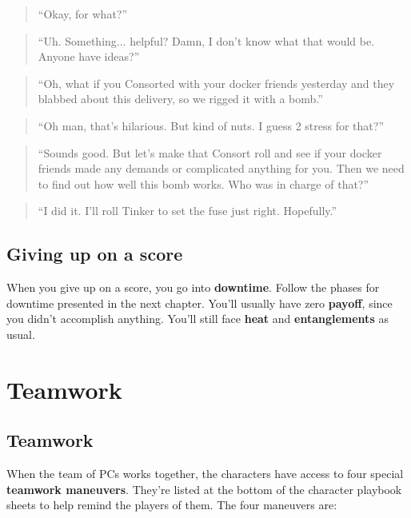\documentclass[11pt,fleqn,a5paper]{book}
\newcommand{\gameterm}[1]{\textbf{#1}}
\begin{document}
\begin{quote}
	“Okay, for what?”
\end{quote} 

\begin{quote}
	“Uh. Something... helpful? Damn, I don’t know what that would be. Anyone have ideas?”
\end{quote} 

\begin{quote}
	“Oh, what if you Consorted with your docker friends yesterday and they blabbed about this delivery, so we rigged it with a bomb.”
\end{quote} 

\begin{quote}
	“Oh man, that’s hilarious. But kind of nuts. I guess 2 stress for that?”
\end{quote} 

\begin{quote}
	“Sounds good. But let’s make that Consort roll and see if your docker friends made any demands or complicated anything for you. Then we need to find out how well this bomb works. Who was in charge of that?”
\end{quote} 

\begin{quote}
	“I did it. I’ll roll Tinker to set the fuse just right. Hopefully.”
\end{quote} 

\section{Giving up on a score}

When you give up on a score, you go into \textbf{downtime}. Follow the phases for downtime presented in the next chapter. You’ll usually have zero \textbf{payoff}, since you didn’t accomplish anything. You’ll still face \gameterm{heat}  and \textbf{entanglements} as usual.

\chapter{Teamwork}

\section{Teamwork}

When the team of PCs works together, the characters have access to four special \textbf{teamwork maneuvers}. They’re listed at the bottom of the character playbook sheets to help remind the players of them. The four maneuvers are:
\end{document}
